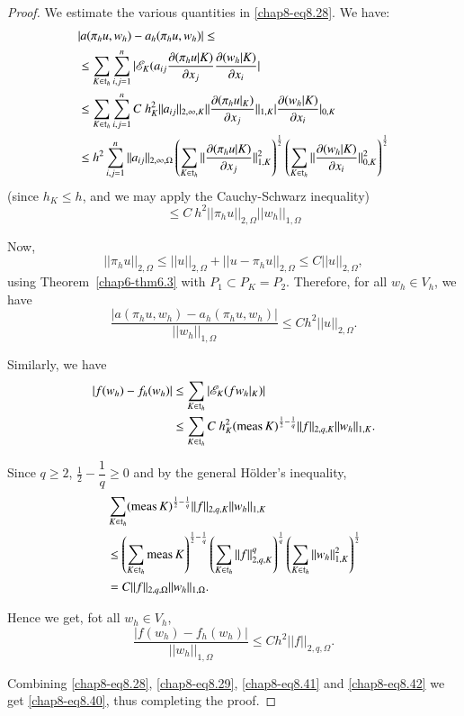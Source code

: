 \begin{proof}
We estimate the various quantities in \eqref{chap8-eq8.28}. We have:
\begin{align*}
& |a(\pi_{h}u,w_{h})-a_{h}(\pi_{h}u,w_{h})|\leq\\
& \leq
  \sum_{K\in\mathfrak{t}_{h}}\sum^{n}_{i,j=1}|\mathscr{E}_{K}(a_{ij}\frac{\p(\pi_{h}u|K)}{\p
    x_{j}}\frac{\p (w_{h}|K)}{\p x_{i}}|\\
&\leq \sum_{K\in
    \mathfrak{t}_{h}}\sum^{n}_{i,j=1}C\ h^{2}_{K}||a_{ij}||_{2,\infty,K}||\frac{\p(\pi_{h}u|_{K})}{\p
    x_{j}}||_{1,K}|\frac{\p(w_{h}|K)}{\p x_{i}}|_{0,K}\\
&\leq
  h^{2}\sum^{n}_{i,j=1}||a_{ij}||_{2,\infty,\Omega}\left(\sum_{K\in\mathfrak{t}_{h}}||\frac{\p(\pi_{h}u|K)}{\p
    x_{j}}||^{2}_{1,K}\right)^{\frac{1}{2}}\left(\sum_{K\in\mathfrak{t}_{h}}||\frac{\p
    (w_{h}|K)}{\p x_{i}}||^{2}_{0,K}\right)^{\frac{1}{2}}
\end{align*}
(since $h_{K}\leq h$, and we may apply the Cauchy-Schwarz inequality)
$$
\leq C\ h^{2}||\pi_{h}u||_{2,\Omega}||w_{h}||_{1,\Omega}
$$

Now,
$$
||\pi_{h}u||_{2,\Omega}\leq
||u||_{2,\Omega}+||u-\pi_{h}u||_{2,\Omega}\leq C||u||_{2,\Omega},
$$
using Theorem~\ref{chap6-thm6.3} with $P_{1}\subset
P_{K}=P_{2}$. Therefore, for all $w_{h}\in V_{h}$, we have
\begin{equation*}
\frac{|a(\pi_{h}u,w_{h})-a_{h}(\pi_{h}u,w_{h})|}{||w_{h}||_{1,\Omega}}\leq
Ch^{2}||u||_{2,\Omega}.\tag{8.41}\label{chap8-eq8.41} 
\end{equation*}

Similarly, we have 
\begin{align*}
|f(w_{h})-f_{h}(w_{h})| &\leq
\sum_{K\in\mathfrak{t}_{h}}|\mathscr{E}_{K}(fw_{h}|_{K})|\\ 
&\leq \sum_{K\in\mathfrak{t}_{h}}C\ h^{2}_{K}(\operatorname{meas}
K)^{\frac{1}{2}-\frac{1}{q}}||f||_{2,q,K}||w_{h}||_{1,K}. 
\end{align*}\pageoriginale

Since $q\geq 2$, $\frac{1}{2}-\dfrac{1}{q}\geq 0$ and by the general
H\"older's inequality,
\begin{align*}
& \sum_{K\in \mathfrak{t}_{h}}(\operatorname{meas}
  K)^{\frac{1}{2}-\frac{1}{q}}||f||_{2,q,K}||w_{h}||_{1,K}\\ 
&\leq \left(\sum_{K\in \mathfrak{t}_{h}}\operatorname{meas}
  K\right)^{\frac{1}{2}-\frac{1}{q}}\left(\sum_{K\in\mathfrak{t}_{h}}||f||^{q}_{2,q,K}\right)^{\frac{1}{q}}\left(\sum_{K\in\mathfrak{t}_{h}}||w_{h}||^{2}_{1,K}\right)^{\frac{1}{2}}\\
&=C||f||_{2,q,\Omega}||w_{h}||_{1,\Omega}.
\end{align*}

Hence we get, fot all $w_{h}\in V_{h}$,
\begin{equation*}
\frac{|f(w_{h})-f_{h}(w_{h})|}{||w_{h}||_{1,\Omega}}\leq
Ch^{2}||f||_{2,q,\Omega}.\tag{8.42}\label{chap8-eq8.42} 
\end{equation*}

Combining \eqref{chap8-eq8.28}, \eqref{chap8-eq8.29},
\eqref{chap8-eq8.41} and \eqref{chap8-eq8.42} we get
\eqref{chap8-eq8.40}, thus completing the proof.
\end{proof}

